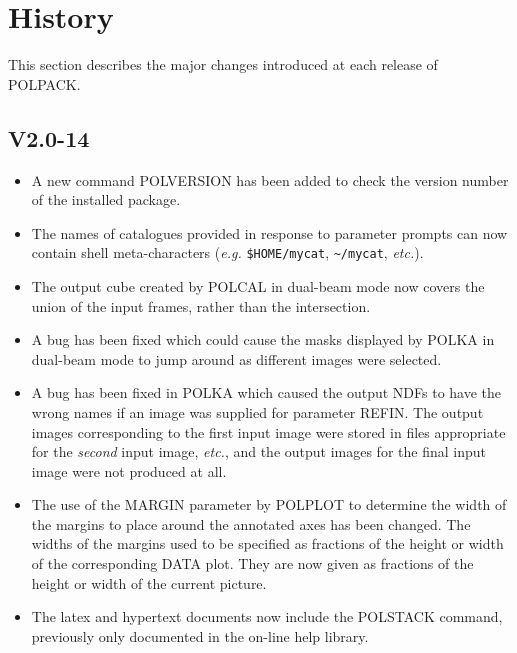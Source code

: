 \documentclass[twoside,11pt]{article}
\newcommand{\htmlref}[2]{#1}
\renewcommand{\_}{\texttt{\symbol{95}}}
\begin{document}
\section{\label{APP:HISTORY}History}
This section describes the major changes introduced at each release of
POLPACK.
\subsection{V2.0-14}

\begin{itemize}

\item A new command \htmlref{POLVERSION}{POLVERSION} has been added to check
the version number of the installed package.

\item The names of catalogues provided in response to parameter prompts 
can now contain shell meta-characters (\emph{e.g.} \verb+$HOME/mycat+, 
\verb+~/mycat+, \emph{etc.}).

\item The output cube created by POLCAL in dual-beam mode now covers the
union of the input frames, rather than the intersection.

\item A bug has been fixed which could cause the masks displayed by POLKA 
in dual-beam mode to jump around as different images were selected.

\item A bug has been fixed in POLKA which caused the output NDFs to have 
the wrong names if an image was supplied for parameter REFIN. The output
images corresponding to the first input image were stored in files
appropriate for the \emph{second} input image, \emph{etc.}, and the 
output images for the final input image were not produced at all.

\item The use of the MARGIN parameter by POLPLOT to determine the width of
the margins to place around the annotated axes has been changed. The widths
of the margins used to be specified as fractions of the height or width
of the corresponding DATA plot. They are now given as fractions of the
height or width of the current picture.

\item The latex and hypertext documents now include the POLSTACK command,
previously only documented in the on-line help library.

\end{itemize}
\end{document}
